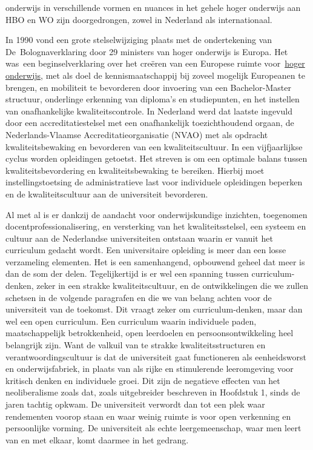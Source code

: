 \documentclass[smallauthor, chapterhaspagenum, nochapterinheader, pagenuminheader,  bigchapnum,medium2, tocpages, garamond, titleinheader]{jote-book}
\begin{document}
onderwijs in verschillende vormen en nuances in het gehele hoger onderwijs aan HBO en WO zijn doorgedrongen, zowel in Nederland als internationaal.



	In 1990 vond een grote stelselwijziging plaats met de ondertekening van De Bolognaverklaring door 29 ministers van hoger onderwijs is Europa. Het was een beginselverklaring over het creëren van een Europese ruimte voor \href{https://nl.wikipedia.org/wiki/Hoger_onderwijs}{hoger onderwijs}, met als doel de kennismaatschappij bij zoveel mogelijk Europeanen te brengen, en mobiliteit te bevorderen door invoering van een Bachelor-Master structuur, onderlinge erkenning van diploma's en studiepunten, en het instellen van onafhankelijke kwaliteitscontrole. In Nederland werd dat laatste ingevuld door een accreditatiestelsel met een onafhankelijk toezichthoudend orgaan, de Nederlands-Vlaamse Accreditatieorganisatie (NVAO) met als opdracht kwaliteitsbewaking en bevorderen van een kwaliteitscultuur. In een vijfjaarlijkse cyclus worden opleidingen getoetst. Het streven is om een optimale balans tussen kwaliteitsbevordering en kwaliteitsbewaking te bereiken. Hierbij moet instellingstoetsing de administratieve last voor individuele opleidingen beperken en de kwaliteitscultuur aan de universiteit bevorderen.



	Al met al is er dankzij de aandacht voor onderwijskundige inzichten, toegenomen docentprofessionalisering, en versterking van het kwaliteitsstelsel, een systeem en cultuur aan de Nederlandse universiteiten ontstaan waarin er vanuit het curriculum gedacht wordt. Een universitaire opleiding is meer dan een losse verzameling elementen. Het is een samenhangend, opbouwend geheel dat meer is dan de som der delen. Tegelijkertijd is er wel een spanning tussen curriculum-denken, zeker in een strakke kwaliteitscultuur, en de ontwikkelingen die we zullen schetsen in de volgende paragrafen en die we van belang achten voor de universiteit van de toekomst. Dit vraagt zeker om curriculum-denken, maar dan wel een open curriculum. Een curriculum waarin individuele paden, maatschappelijk betrokkenheid, open leerdoelen en persoonsontwikkeling heel belangrijk zijn. Want de valkuil van te strakke kwaliteitsstructuren en verantwoordingscultuur is dat de universiteit gaat functioneren als eenheidsworst en onderwijsfabriek, in plaats van als rijke en stimulerende leeromgeving voor kritisch denken en individuele groei. Dit zijn de negatieve effecten van het neoliberalisme zoals dat, zoals uitgebreider beschreven in Hoofdstuk 1, sinds de jaren tachtig opkwam. De universiteit verwordt dan tot een plek waar rendementen voorop staan en waar weinig ruimte is voor open verkenning en persoonlijke vorming. De universiteit als echte leergemeenschap, waar men leert van en met elkaar, komt daarmee in het gedrang.
\end{document}
